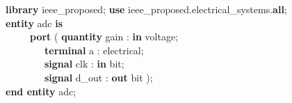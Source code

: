 {\small
\begin{tabbing}
\ \ \ \= \textbf{library} ieee\_proposed; \textbf{use} ieee\_proposed.electrical\_systems.\textbf{all}; \\ 
\ \ \ \= \textbf{entity} adc \textbf{is} \\
\> \ \ \ \ \ \ \ \ \= \textbf{port} ( \textbf{quantity} gain : \textbf{in} voltage; \\
\> \> \ \ \ \ \ \ \ \ \ \ \ \= \textbf{terminal} a : electrical; \\
\> \> \ \ \ \ \ \ \ \ \ \ \ \= \textbf{signal} clk : \textbf{in} bit; \\
\> \> \ \ \ \ \ \ \ \ \ \ \ \= \textbf{signal} d\_out : \textbf{out} bit ); \\
\ \ \ \= \textbf{end entity} adc;
\end{tabbing}
}

